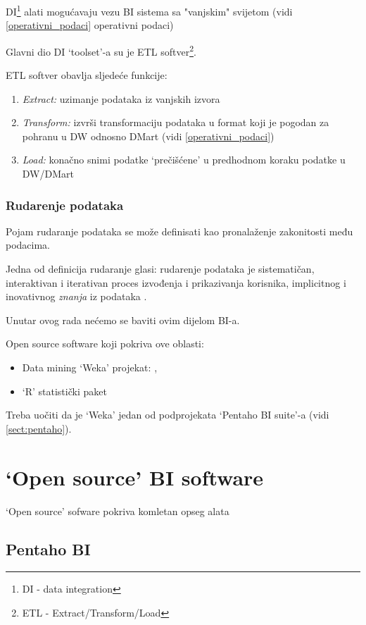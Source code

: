 \documentclass[times, utf8, seminar]{fit}
\begin{document}
DI\footnote{DI - data integration} alati mogućavaju vezu BI sistema sa "vanjskim" svijetom (vidi \ref{operativni_podaci} operativni podaci)

Glavni dio DI `toolset'-a su je ETL softver\footnote{ETL - Extract/Transform/Load}. 

ETL softver obavlja sljedeće funkcije:

\begin{enumerate}
  \item \emph{Extract:}  uzimanje podataka iz vanjskih izvora
  \item \emph{Transform:} izvrši transformaciju podataka u format koji je pogodan za pohranu u DW odnosno DMart (vidi \ref{operativni_podaci})
  \item \emph{Load:} konačno snimi podatke `prečišćene' u predhodnom koraku podatke u DW/DMart
\end{enumerate}
 
\subsection{Rudarenje podataka}

Pojam rudaranje podataka se može definisati kao pronalaženje zakonitosti među podacima. 

Jedna od definicija rudaranje glasi: rudarenje podataka je sistematičan, interaktivan i iterativan proces izvođenja i prikazivanja korisnika, implicitnog i inovativnog \emph{znanja} iz podataka \cite[str.~40]{mag_mrsic}.

Unutar ovog rada nećemo se baviti ovim dijelom BI-a.

Open source software koji pokriva ove oblasti:
 
\begin{itemize}
  \item Data mining `Weka' projekat: \cite{web:weka}, \cite{web:pentaho_weka}
  \item `R' statistički paket \cite{web:r}
\end{itemize}

Treba uočiti da je `Weka' jedan od podprojekata `Pentaho BI suite'-a (vidi \ref{sect:pentaho}).

\chapter{`Open source' BI software}

`Open source' sofware pokriva komletan opseg alata

\section{Pentaho BI}
\end{document}
